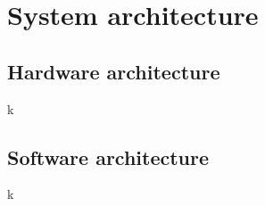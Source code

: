 \chapter{System architecture}

\section{Hardware architecture}
k

\section{Software architecture}
k

